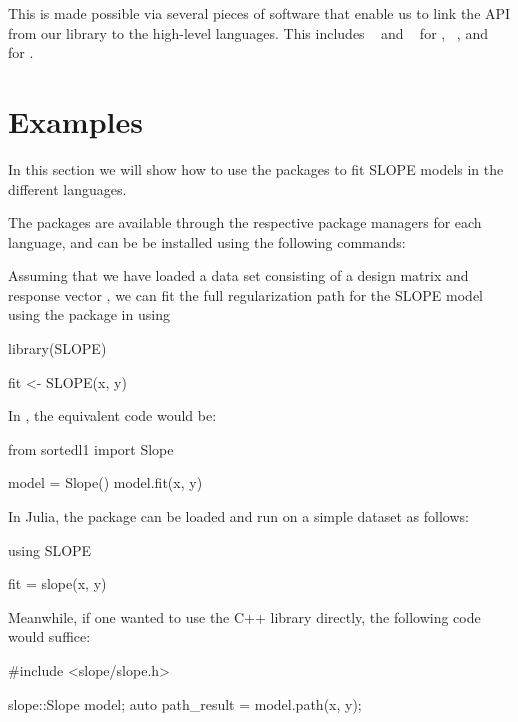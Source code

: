 \documentclass[article]{jss}
\begin{document}
This is made possible via several pieces of software that enable us to link the
API from our  library to the high-level languages. This includes
~\citep{eddelbuettel2011} and ~\citep{bates2013} for
, ~\citep{jakob2025}, and ~\citep{janssens2020} for
.

\section{Examples}

In this section we will show how to use the packages to fit SLOPE models in
the different languages.

The packages are
available through the respective package managers for each language, and can be
be installed using the following commands:

\begin{description}[labelwidth=8ex]
  \item[\proglang{R}] 
  \item[\proglang{Python}] 
  \item[\proglang{Julia}] 
\end{description}

Assuming that we have loaded a data set consisting of a design
matrix  and response vector , we can fit the full regularization
path for the SLOPE model using the
 package in  using
\begin{Code}
  library(SLOPE)

  fit <- SLOPE(x, y)
\end{Code}

In , the equivalent code would be:
\begin{Code}
  from sortedl1 import Slope

  model = Slope()
  model.fit(x, y)
\end{Code}

In Julia, the package can be loaded and run on a simple dataset as follows:
\begin{Code}
  using SLOPE

  fit = slope(x, y)
\end{Code}

Meanwhile, if one wanted to use the C++ library directly, the following code
would suffice:
\begin{Code}
  #include <slope/slope.h>

  slope::Slope model;
  auto path_result = model.path(x, y);
\end{Code}
\end{document}
